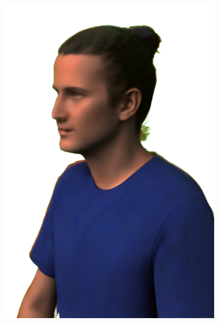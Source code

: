\begin{figure}[ht]
\begin{subfigure}{0.2\linewidth}
		\includegraphics[width=\textwidth]{Figures/results/high/ephra_3d/25_render.png}
	\end{subfigure}
	\begin{subfigure}{0.2\linewidth}

\end{subfigure}
\end{figure}

